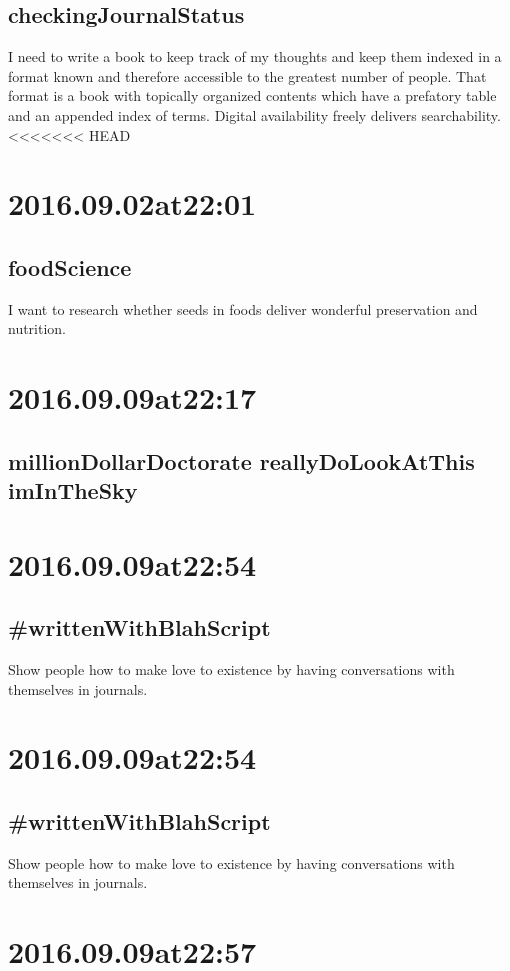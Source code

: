\begin{enumerate}
\begin{enumerate}
\subsection*{checkingJournalStatus}
I need to write a book to keep track of my thoughts and keep them indexed in a format known and therefore accessible to the greatest number of people. That format is a book with topically organized contents which have a prefatory table and an appended index of terms. Digital availability freely delivers searchability.
<<<<<<< HEAD

\section*{ 2016.09.02at22:01 }
\subsection*{ foodScience }
I want to research whether seeds in foods deliver wonderful preservation and nutrition.

\section*{ 2016.09.09at22:17 }
\subsection*{ millionDollarDoctorate reallyDoLookAtThis imInTheSky }


\section*{ 2016.09.09at22:54 }
\subsection*{ #writtenWithBlahScript }
Show people how to make love to existence by having conversations with themselves in journals.

\section*{ 2016.09.09at22:54 }
\subsection*{ #writtenWithBlahScript }
Show people how to make love to existence by having conversations with themselves in journals.

\section*{ 2016.09.09at22:57 }

\end{enumerate}
\end{enumerate}
